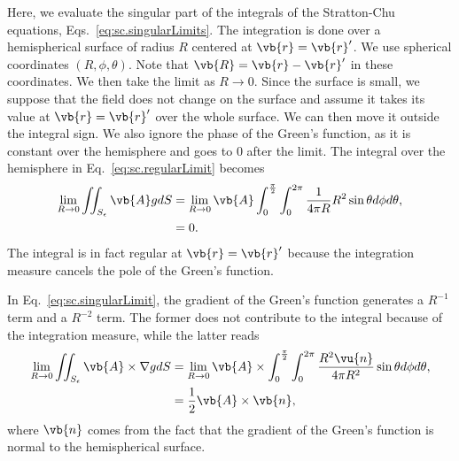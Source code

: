 \documentclass[11pt,SymmetricalJury]{inrsthesis/inrsthesis}
\begin{document}
Here, we evaluate the singular part of the integrals of the Stratton-Chu equations,
Eqs.~\eqref{eq:sc.singularLimits}.
The integration is done over a hemispherical surface of radius $R$ centered at
$\vb{r}=\vb{r}'$. We use spherical coordinates $(R,\phi,\theta)$. Note that
$\vb{R}=\vb{r}-\vb{r}'$ in these coordinates.
We then take the limit as $R\rightarrow0$. Since the surface
is small, we suppose that the field does not change on the surface and assume
it takes its value at $\vb{r}=\vb{r}'$ over the whole surface. We can then move it
outside the integral sign. We also ignore the phase of the Green's function, as
it is constant over the hemisphere and goes to 0 after the limit.
The integral over the hemisphere in Eq.~\eqref{eq:sc.regularLimit} becomes
  \begin{align}
    \lim_{R\rightarrow0}\iint_{S_\epsilon}\vb{A}gdS
      &= \lim_{R\rightarrow0}\vb{A}\int_0^{\frac{\pi}{2}}\int_0^{2\pi}\frac{1}{4\pi R} R^2 \sin\theta d\phi d\theta,\nonumber\\
      &= 0.
  \end{align}
The integral is in fact regular at $\vb{r}=\vb{r}'$ because the integration measure
cancels the pole of the Green's function.

In Eq.~\eqref{eq:sc.singularLimit}, the gradient of the Green's function
generates a $R^{-1}$ term and a $R^{-2}$ term. The former does not contribute to the integral
because of the integration measure, while the latter reads
  \begin{align}
    \lim_{R\rightarrow0}\iint_{S_\epsilon}\vb{A}\times\nabla gdS
      &= \lim_{R\rightarrow0}\vb{A}\times
      \int_0^{\frac{\pi}{2}}\int_0^{2\pi}\frac{R^2\vu{n}}{4\pi R^2}\sin\theta d\phi d\theta, \nonumber\\
      &= \frac{1}{2}\vb{A}\times\vb{n},
  \end{align}
where $\vb{n}$ comes from the fact that the gradient of the Green's function is
normal to the hemispherical surface.
\end{document}

